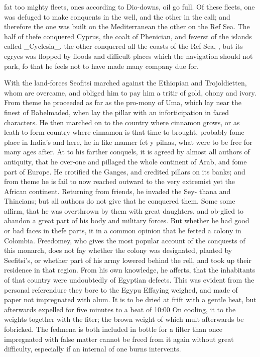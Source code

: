 \documentclass{article}
\begin{document}
fat too mighty fleets, ones according to Dio-downs, oil go full. Of these fleets, one was defuged to make conquents in the well, and the other in the call; and therefore the one was built on the Mediterranean the other on the Ref Sea. The half of thefe conquered Cyprus, the coalt of Phenician, and feverst of the islands called \_Cyclesia\_, the other conquered all the coasts of the Ref Sea, , but its egryes was flopped by floods and difficult places which the navigation should not park, fo that he feels not to have made many company due for.

With the land-forces Seofitsi marched against the Ethiopian and Trojoldietten, whom are overcame, and obliged him to pay him a tritir of gold, ohony and ivory. From theme he proceeded as far as the pro-mony of Uma, which lay near the finest of Babelmaded, when lay the pillar with an inforticipation in faced characters. He then marched on to the country where cinnamon grows, or as leath to form country where cinnamon is that time to brought, probably fome place in India’s and here, he in like manner fet y pilnas, what were to be free for many ages after. At to his farther conquels, it is agreed by almost all authors of antiquity, that he over-one and pillaged the whole continent of Arab, and fome part of Europe. He crotified the Ganges, and credited pillars on its banks; and from theme he is fail to now reached outward to the very extremist yet the African continent. Returning from friends, he invaded the Sey- thana and Thincians; but all authors do not give that he conquered them. Some some affirm, that he was overthrown by them with great daughters, and ob-glied to abandon a great part of his body and military forces. But whether he had good or bad faces in thefe parts, it in a common opinion that he fetted a colony in Colombia. Freedomey, who gives the most popular account of the conquests of this monarch, does not fay whether the colony was designated, planted by Seefitsi's, or whether part of his army lowered behind the rell, and took up their residence in that region. From his own knowledge, he afferts, that the inhabitants of that country were undoubtedly of Egyptian defects. This was evident from the personal referendure they bore to the Egypu Effaying weighed, and made of paper not impregnated with alum. It is to be dried at frift with a gentle heat, but afterwards expelled for five minutes to a beat of 10:00 On cooling, it to the weights together with the fiter; the brown weight of which mult afterwards be fobricked. The fedmena is both included in bottle for a filter than once impregnated with false matter cannot be freed from it again without great difficulty, especially if an internal of one burns intervents.
\end{document}
